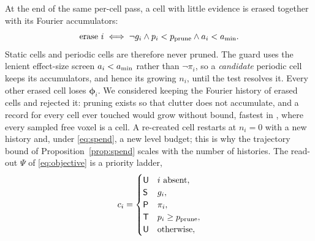 At the end of the same per-cell pass, a cell with little evidence is erased together with its Fourier accumulators:
\begin{equation}\label{eq:prune}
  \text{erase } i \iff \lnot g_i\land p_i<p_{\mathrm{prune}}\land a_i<a_{\min} .
\end{equation}
Static cells and periodic cells are therefore never pruned. The guard uses the lenient effect-size screen $a_i<a_{\min}$ rather than $\lnot\pi_i$, so a \emph{candidate} periodic cell keeps its accumulators, and hence its growing $n_i$, until the test resolves it. Every other erased cell loses $\boldsymbol{\phi}_i$. We considered keeping the Fourier history of erased cells and rejected it: pruning exists so that clutter does not accumulate, and a record for every cell ever touched would grow without bound, fastest in , where every sampled free voxel is a cell. A re-created cell restarts at $n_i=0$ with a new history and, under \eqref{eq:spend}, a new level budget; this is why the trajectory bound of Proposition~\ref{prop:spend} scales with the number of histories. The read-out $\Psi$ of \eqref{eq:objective} is a priority ladder,
\begin{equation}\label{eq:classify}
  c_i=\begin{cases}
    \mathsf{U} & i\text{ absent},\\
    \mathsf{S} & g_i,\\
    \mathsf{P} & \pi_i,\\
    \mathsf{T} & p_i\ge p_{\mathrm{prune}},\\
    \mathsf{U} & \text{otherwise},
  \end{cases}
\end{equation}
